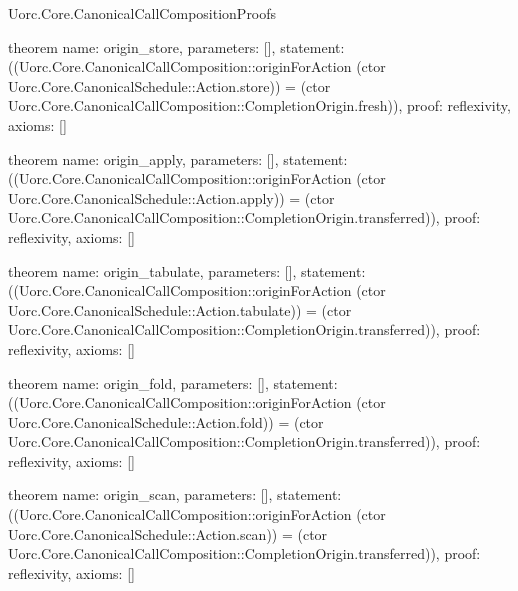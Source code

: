 \begin{lexlean}{Uorc.Core.CanonicalCallCompositionProofs}
\begin{semanticmodule}
theorem{
  name: origin_store,
  parameters: [],
  statement: ((Uorc.Core.CanonicalCallComposition::originForAction (ctor Uorc.Core.CanonicalSchedule::Action.store)) = (ctor Uorc.Core.CanonicalCallComposition::CompletionOrigin.fresh)),
  proof: reflexivity{},
  axioms: []
}

theorem{
  name: origin_apply,
  parameters: [],
  statement: ((Uorc.Core.CanonicalCallComposition::originForAction (ctor Uorc.Core.CanonicalSchedule::Action.apply)) = (ctor Uorc.Core.CanonicalCallComposition::CompletionOrigin.transferred)),
  proof: reflexivity{},
  axioms: []
}

theorem{
  name: origin_tabulate,
  parameters: [],
  statement: ((Uorc.Core.CanonicalCallComposition::originForAction (ctor Uorc.Core.CanonicalSchedule::Action.tabulate)) = (ctor Uorc.Core.CanonicalCallComposition::CompletionOrigin.transferred)),
  proof: reflexivity{},
  axioms: []
}

theorem{
  name: origin_fold,
  parameters: [],
  statement: ((Uorc.Core.CanonicalCallComposition::originForAction (ctor Uorc.Core.CanonicalSchedule::Action.fold)) = (ctor Uorc.Core.CanonicalCallComposition::CompletionOrigin.transferred)),
  proof: reflexivity{},
  axioms: []
}

theorem{
  name: origin_scan,
  parameters: [],
  statement: ((Uorc.Core.CanonicalCallComposition::originForAction (ctor Uorc.Core.CanonicalSchedule::Action.scan)) = (ctor Uorc.Core.CanonicalCallComposition::CompletionOrigin.transferred)),
  proof: reflexivity{},
  axioms: []
}
\end{semanticmodule}
\end{lexlean}
